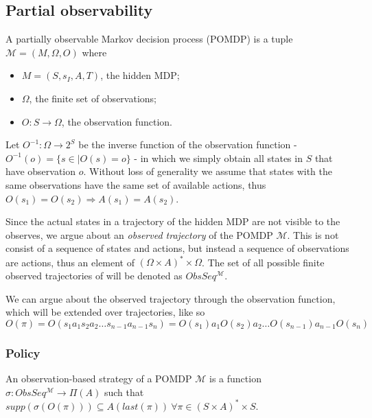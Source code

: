\subsection{Partial observability}

\begin{definition}[POMDP]
	A partially observable Markov decision process (POMDP) is a tuple $\mathcal{M}=(M, \Omega, O)$ where 
	\begin{itemize}
		\item $M=(S,s_I,A,T)$, the hidden MDP;
		\item $\Omega$, the finite set of observations;
		\item $O:S\to \Omega$, the observation function. 
	\end{itemize}
\end{definition}

Let $O^{-1}:\Omega\to 2^S$ be the inverse function of the observation function - $O^{-1}(o)=\{s\in \mid O(s)=o\}$ - in which we simply obtain all states in $S$ that have observation $o$.
Without loss of generality we assume that states with the same observations have the same set of available actions, thus $O(s_1)=O(s_2)\Rightarrow A(s_1)=A(s_2)$.

Since the actual states in a trajectory of the hidden MDP are not visible to the observes, we argue about an \textit{observed trajectory} of the POMDP $\mathcal{M}$. This is not consist of a sequence of states and actions, but instead a sequence of observations are actions, thus an element of $(\Omega\times A)^*\times \Omega$. The set of all possible finite observed trajectories of will be denoted as $ObsSeq^{\mathcal{M}}$.

We can argue about the observed trajectory through the observation function, which will be extended over trajectories, like so
\[O(\pi)=O(s_1 a_1 s_2 a_2\dots s_{n-1} a_{n-1} s_n) = O(s_1) a_1 O(s_2) a_2\dots O(s_{n-1}) a_{n-1} O(s_n)\]


\subsubsection*{Policy}
\begin{definition}
	An observation-based strategy of a POMDP $\mathcal{M}$ is a function $\sigma:ObsSeq^{\mathcal{M}}\to\Pi(A)$ such that $supp(\sigma(O(\pi)))\subseteq A (last(\pi))\ \forall \pi\in(S\times A)^*\times S$.
\end{definition}

